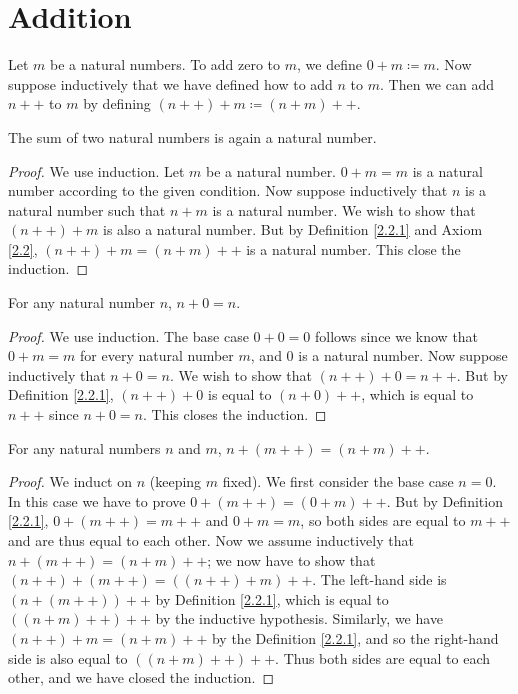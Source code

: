 \section{Addition}

\begin{definition}\label{2.2.1}
Let \(m\) be a natural numbers.
To add zero to \(m\), we define \(0+m \coloneqq m\).
Now suppose inductively that we have defined how to add \(n\) to \(m\).
Then we can add \(n++\) to \(m\) by defining \((n++) + m \coloneqq (n + m)++\).
\end{definition}

\begin{additional corollary}\label{ac 2.2.1}
The sum of two natural numbers is again a natural number.
\end{additional corollary}

\begin{proof}
We use induction.
Let \(m\) be a natural number.
\(0 + m = m\) is a natural number according to the given condition.
Now suppose inductively that \(n\) is a natural number such that \(n + m\) is a natural number.
We wish to show that \((n++) + m\) is also a natural number.
But by Definition \ref{2.2.1} and Axiom \ref{2.2},
\((n++) + m = (n + m)++\) is a natural number.
This close the induction.
\end{proof}

\begin{lemma}\label{2.2.2}
For any natural number \(n\), \(n + 0 = n\).
\end{lemma}

\begin{proof}
We use induction.
The base case \(0 + 0 = 0\) follows since we know that \(0 + m = m\) for every natural number \(m\), and \(0\) is a natural number.
Now suppose inductively that \(n + 0 = n\).
We wish to show that \((n++) + 0 = n++\).
But by Definition \ref{2.2.1}, \((n++) + 0\) is equal to \((n + 0)++\), which is equal to \(n++\) since \(n + 0 = n\).
This closes the induction.
\end{proof}

\begin{lemma}\label{2.2.3}
For any natural numbers \(n\) and \(m\), \(n + (m++) = (n + m)++\).
\end{lemma}

\begin{proof}
We induct on \(n\) (keeping \(m\) fixed).
We first consider the base case \(n = 0\).
In this case we have to prove \(0 + (m++) = (0 + m)++\).
But by Definition \ref{2.2.1}, \(0 + (m++) = m++\) and \(0 + m = m\), so both sides are equal to \(m++\) and are thus equal to each other.
Now we assume inductively that \(n + (m++) = (n + m)++\);
we now have to show that \((n++) + (m++) = ((n++) + m)++\).
The left-hand side is \((n + (m++))++\) by Definition \ref{2.2.1}, which is equal to \(((n+m)++)++\) by the inductive hypothesis.
Similarly, we have \((n++) + m = (n + m)++\) by the Definition \ref{2.2.1}, and so the right-hand side is also equal to \(((n + m)++)++\).
Thus both sides are equal to each other, and we have closed the induction.
\end{proof}

